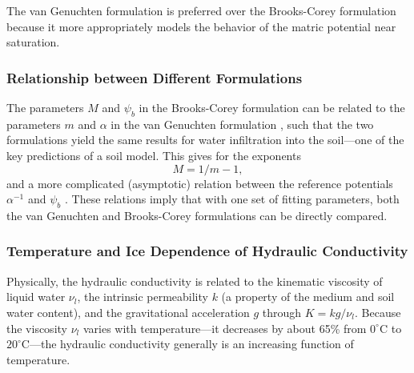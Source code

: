 \documentclass[twoside,10pt]{report}
\begin{document}
The van Genuchten formulation is preferred over the Brooks-Corey formulation because it more appropriately models the behavior of the matric potential near saturation. 

\subsubsection{Relationship between Different Formulations}

The parameters $M$ and $\psi_b$ in the Brooks-Corey formulation can be related to the parameters $m$ and $\alpha$ in the van Genuchten formulation \citep{Morel-Seytoux96a}, such that the two formulations yield the same results for water infiltration into the soil---one of the key predictions of a soil model. This gives for the exponents 
\[
M = 1/m - 1,
\]
and a more complicated (asymptotic) relation between the reference potentials $\alpha^{-1}$ and $\psi_b$ \citep{Morel-Seytoux96a}. These relations imply that with one set of fitting parameters, both the van Genuchten and Brooks-Corey formulations can be directly compared. 

\subsubsection{Temperature and Ice Dependence of Hydraulic Conductivity}

Physically, the hydraulic conductivity is related to the kinematic viscosity of liquid water $\nu_l$, the intrinsic permeability $k$ (a property of the medium and soil water content), and the gravitational acceleration $g$ through $K=kg/\nu_l$. Because the viscosity $\nu_l$ varies with temperature---it decreases by about 65\% from $0^\circ\mathrm{C}$ to $20^\circ\mathrm{C}$---the hydraulic conductivity generally is an increasing function of temperature. 
\end{document}
